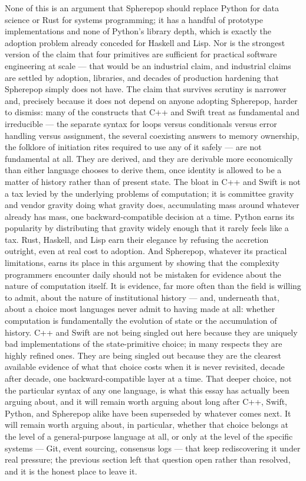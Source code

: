 \documentclass[11pt]{article}
\begin{document}
None of this is an argument that Spherepop should replace Python for data science or Rust for systems programming; it has a handful of prototype implementations and none of Python's library depth, which is exactly the adoption problem already conceded for Haskell and Lisp. Nor is the strongest version of the claim that four primitives are sufficient for practical software engineering at scale --- that would be an industrial claim, and industrial claims are settled by adoption, libraries, and decades of production hardening that Spherepop simply does not have. The claim that survives scrutiny is narrower and, precisely because it does not depend on anyone adopting Spherepop, harder to dismiss: many of the constructs that C++ and Swift treat as fundamental and irreducible --- the separate syntax for loops versus conditionals versus error handling versus assignment, the several coexisting answers to memory ownership, the folklore of initiation rites required to use any of it safely --- are not fundamental at all. They are derived, and they are derivable more economically than either language chooses to derive them, once identity is allowed to be a matter of history rather than of present state. The bloat in C++ and Swift is not a tax levied by the underlying problems of computation; it is committee gravity and vendor gravity doing what gravity does, accumulating mass around whatever already has mass, one backward-compatible decision at a time. Python earns its popularity by distributing that gravity widely enough that it rarely feels like a tax. Rust, Haskell, and Lisp earn their elegance by refusing the accretion outright, even at real cost to adoption. And Spherepop, whatever its practical limitations, earns its place in this argument by showing that the complexity programmers encounter daily should not be mistaken for evidence about the nature of computation itself. It is evidence, far more often than the field is willing to admit, about the nature of institutional history --- and, underneath that, about a choice most languages never admit to having made at all: whether computation is fundamentally the evolution of state or the accumulation of history. C++ and Swift are not being singled out here because they are uniquely bad implementations of the state-primitive choice; in many respects they are highly refined ones. They are being singled out because they are the clearest available evidence of what that choice costs when it is never revisited, decade after decade, one backward-compatible layer at a time. That deeper choice, not the particular syntax of any one language, is what this essay has actually been arguing about, and it will remain worth arguing about long after C++, Swift, Python, and Spherepop alike have been superseded by whatever comes next. It will remain worth arguing about, in particular, whether that choice belongs at the level of a general-purpose language at all, or only at the level of the specific systems --- Git, event sourcing, consensus logs --- that keep rediscovering it under real pressure; the previous section left that question open rather than resolved, and it is the honest place to leave it.
\end{document}
